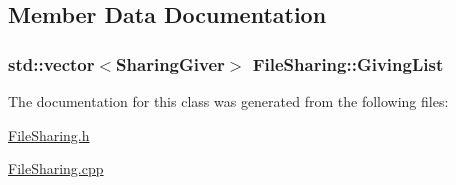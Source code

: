 \subsection{Member Data Documentation}
\hypertarget{classFileSharing_aed8e9364c1d72f1fd16fc5bd2de88607}{
\subsubsection[{Giving\-List}]{\setlength{\rightskip}{0pt plus 5cm}std\-::vector$<${\bf Sharing\-Giver}$>$ File\-Sharing\-::\-Giving\-List\hspace{0.3cm}{\ttfamily [private]}}}\label{classFileSharing_aed8e9364c1d72f1fd16fc5bd2de88607}


The documentation for this class was generated from the following files\-:\begin{DoxyCompactItemize}
\item 
\hyperlink{FileSharing_8h}{File\-Sharing.\-h}\item 
\hyperlink{FileSharing_8cpp}{File\-Sharing.\-cpp}\end{DoxyCompactItemize}
